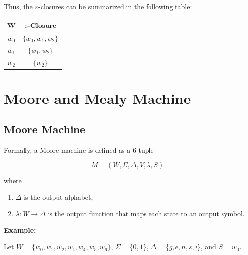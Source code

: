 \documentclass[12pt,a4paper,openany]{article}
\begin{document}
Thus, the $\varepsilon$-closures can be summarized in the following table:

\begin{center}
\begin{tabular}{c|c}
\textbf{W} & \textbf{$\varepsilon$-Closure} \\
\hline
$w_0$ & $\{w_0, w_1, w_2\}$ \\
$w_1$ & $\{w_1, w_2\}$ \\
$w_2$ & $\{w_2\}$ \\
\end{tabular}
\end{center}

\section{Moore and Mealy Machine}

\subsection{Moore Machine}

Formally, a Moore machine is defined as a 6-tuple

\[M = (W, \Sigma, \Delta, V, \lambda, S)\]

where

\begin{enumerate}
    \item $\Delta$ is the output alphabet,
    \item $\lambda: W \to \Delta$ is the output function that maps each state to an output symbol.
\end{enumerate}

\textbf{Example:}

Let $W = \{w_0, w_1, w_2, w_3, w_4, w_5, w_6\}$, $\Sigma = \{0, 1\}$, $\Delta = \{g, e, n, s, i\}$, and $S = w_0$.
\end{document}

